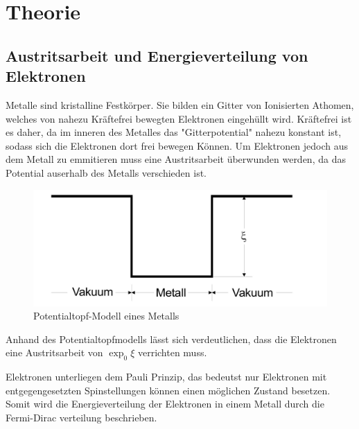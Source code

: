 \section{Theorie}
\label{sec:Theorie}
\subsection{Austritsarbeit und Energieverteilung von Elektronen}
Metalle sind kristalline Festkörper. Sie bilden ein Gitter von 
Ionisierten Athomen, welches von nahezu Kräftefrei bewegten Elektronen 
eingehüllt wird. Kräftefrei ist es daher, da im inneren des Metalles das "Gitterpotential"
nahezu konstant ist, sodass sich die Elektronen dort frei bewegen Können. Um Elektronen jedoch 
aus dem Metall zu emmitieren muss eine Austritsarbeit überwunden werden, da das Potential auserhalb 
des Metalls verschieden ist.
\begin{figure}[H]
    \centering
        \centering
        \includegraphics[width=\textwidth]{Bilder/potentialtopf.jpg}
        \caption{Potentialtopf-Modell eines Metalls}
    \hfill
    \label{fig:phasendiagramm}
\end{figure}
Anhand des Potentialtopfmodells lässt sich verdeutlichen, dass die Elektronen eine Austritsarbeit von 
$\exp _0 \xi$ verrichten muss.

Elektronen unterliegen dem Pauli Prinzip, das bedeutst nur Elektronen mit entgegengesetzten Spinstellungen können einen möglichen Zustand besetzen. 
Somit wird die Energieverteilung der Elektronen in einem Metall durch die Fermi-Dirac verteilung beschrieben.

